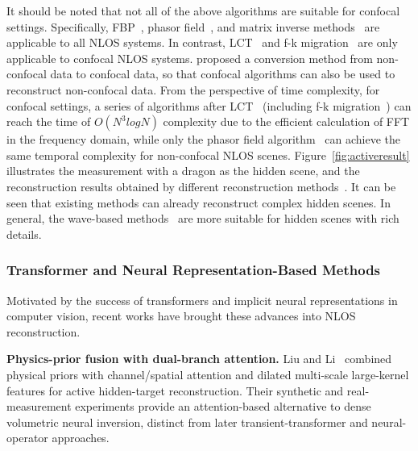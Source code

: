 It should be noted that not all of the above algorithms are suitable for confocal settings. Specifically, FBP~\cite{arellanoFastBackprojectionNonline2017,veltenRecoveringThreedimensionalShape2012}, phasor field~\cite{liuPhasorFieldDiffraction2020,liuVirtualWaveOptics2018}, and matrix inverse methods~\cite{heideDiffuseMirrors3D2014} are applicable to all NLOS systems. In contrast, LCT~\cite{otooleConfocalNonlineofsightImaging2018} and f-k migration~\cite{Lindell:2019:Wave} are only applicable to confocal NLOS systems. \cite{Lindell:2019:Wave} proposed a conversion method from non-confocal data to confocal data, so that confocal algorithms can also be used to reconstruct non-confocal data. From the perspective of time complexity, for confocal settings, a series of algorithms after LCT~\cite{otooleConfocalNonlineofsightImaging2018} (including f-k migration~\cite{Lindell:2019:Wave}) can reach the time of $O(N^3logN)$ complexity due to the efficient calculation of FFT in the frequency domain, while only the phasor field algorithm~\cite{liuPhasorFieldDiffraction2020} can achieve the same temporal complexity for non-confocal NLOS scenes.
Figure~\ref{fig:activeresult} illustrates the measurement with a dragon as the hidden scene, and the reconstruction results obtained by different reconstruction methods~\cite{otooleConfocalNonlineofsightImaging2018,veltenRecoveringThreedimensionalShape2012,liuVirtualWaveOptics2018,Lindell:2019:Wave}. It can be seen that existing methods can already reconstruct complex hidden scenes. In general, the wave-based methods~\cite{liuVirtualWaveOptics2018,Lindell:2019:Wave} are more suitable for hidden scenes with rich details.


\subsubsection{Transformer and Neural Representation-Based Methods}
\label{sec:transformerNeural}
Motivated by the success of transformers and implicit neural representations in computer vision, recent works have brought these advances into NLOS reconstruction.

\vspace{0.8mm}
\noindent \textbf{Physics-prior fusion with dual-branch attention.}
Liu and Li~\cite{liuPhysicalPriorActiveNLOS2025} combined physical priors with channel/spatial attention and dilated multi-scale large-kernel features for active hidden-target reconstruction. Their synthetic and real-measurement experiments provide an attention-based alternative to dense volumetric neural inversion, distinct from later transient-transformer and neural-operator approaches.


